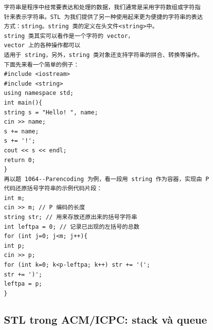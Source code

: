 \documentclass[11pt]{article}
\begin{document}
\begingroup
\scriptsize
\begin{verbatim}
字符串是程序中经常要表达和处理的数据，我们通常是采用字符数组或字符指
针来表示字符串。STL 为我们提供了另一种使用起来更为便捷的字符串的表达
方式：string。string 类的定义在头文件<string>中。
string 类其实可以看作是一个字符的 vector，
vector 上的各种操作都可以
适用于 string，另外，string 类对象还支持字符串的拼合、转换等操作。
下面先来看一个简单的例子：
#include <iostream>
#include <string>
using namespace std;
int main(){
string s = "Hello! ", name;
cin >> name;
s += name;
s += '!';
cout << s << endl;
return 0;
}
再以题 1064--Parencoding 为例，看一段用 string 作为容器，实现由 P
代码还原括号字符串的示例代码片段：
int m;
cin >> m; // P 编码的长度
string str; // 用来存放还原出来的括号字符串
int leftpa = 0; // 记录已出现的左括号的总数
for (int j=0; j<m; j++){
int p;
cin >> p;
for (int k=0; k<p-leftpa; k++) str += '(';
str += ')';
leftpa = p;
}
\end{verbatim}
\endgroup

\subsection{STL trong ACM/ICPC: stack và queue}
\end{document}
